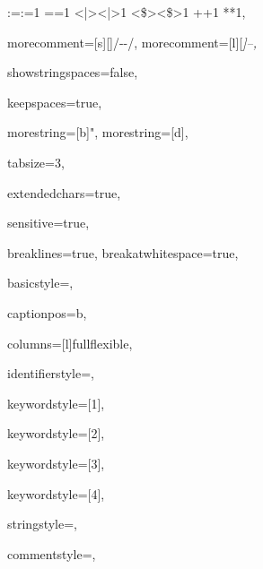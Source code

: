 {{:=}{{\color{symbolcolor}:=}}1
{=}{{\color{symbolcolor}=}}1
{<|>}{{\color{symbolcolor}<|>}}1
{<\$>}{{\color{symbolcolor}<\$>}}1
{+}{{\color{symbolcolor}+}}1
{*}{{\color{symbolcolor}*}}1,

morecomment=[s][\color{commentcolor}]{/-}{-/},
morecomment=[l][\itshape \color{commentcolor}]{--},

showstringspaces=false,

keepspaces=true,

morestring=[b]",
morestring=[d],

tabsize=3,

extendedchars=true,

sensitive=true,

breaklines=true,
breakatwhitespace=true,

basicstyle=\ttfamily\small,

captionpos=b,

columns=[l]fullflexible,


identifierstyle={\ttfamily\color{black}},

keywordstyle=[1]{\ttfamily\color{keywordcolor}},

keywordstyle=[2]{\ttfamily\color{sortcolor}},

keywordstyle=[3]{\ttfamily\color{tacticcolor}},

keywordstyle=[4]{\ttfamily\color{attributecolor}},

stringstyle=\ttfamily,

commentstyle={\ttfamily\footnotesize },

}
